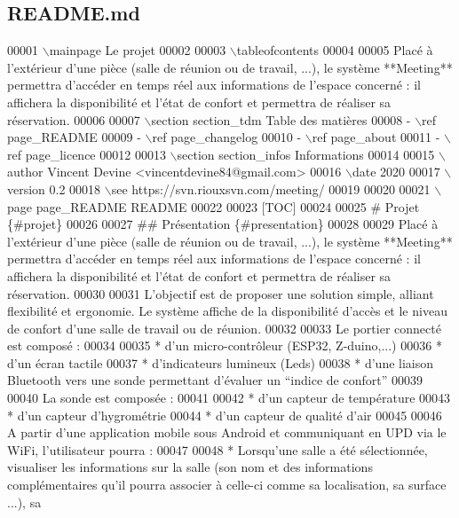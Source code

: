 \hypertarget{_r_e_a_d_m_e_8md_source}{}\subsection{R\+E\+A\+D\+M\+E.\+md}

\begin{DoxyCode}
00001 \(\backslash\)mainpage Le projet 
00002 
00003 \(\backslash\)tableofcontents
00004 
00005 Placé à l'extérieur d'une pièce (salle de réunion ou de travail, ...), le système **Meeting**
       permettra d'accéder en temps réel aux informations de l'espace concerné : il affichera la disponibilité et l'état de
       confort et permettra de réaliser sa réservation.
00006 
00007 \(\backslash\)section section\_tdm Table des matières
00008 - \(\backslash\)ref page\_README
00009 - \(\backslash\)ref page\_changelog
00010 - \(\backslash\)ref page\_about
00011 - \(\backslash\)ref page\_licence
00012 
00013 \(\backslash\)section section\_infos Informations
00014 
00015 \(\backslash\)author Vincent Devine <vincentdevine84@gmail.com>
00016 \(\backslash\)date 2020
00017 \(\backslash\)version 0.2
00018 \(\backslash\)see https://svn.riouxsvn.com/meeting/
00019 
00020 
00021 \(\backslash\)page page\_README README
00022 
00023 [TOC]
00024 
00025 # Projet \{#projet\}
00026 
00027 ## Présentation \{#presentation\}
00028 
00029 Placé à l'extérieur d'une pièce (salle de réunion ou de travail, ...), le système **Meeting**
       permettra d'accéder en temps réel aux informations de l'espace concerné : il affichera la disponibilité et l'état de
       confort et permettra de réaliser sa réservation.
00030 
00031 L'objectif est de proposer une solution simple, alliant flexibilité et ergonomie. Le système affiche
       de la disponibilité d'accès et le niveau de confort d'une salle de travail ou de réunion.
00032 
00033 Le portier connecté est composé :
00034 
00035 * d'un micro-contrôleur (ESP32, Z-duino,...)
00036 * d'un écran tactile
00037 * d'indicateurs lumineux (Leds)
00038 * d'une liaison Bluetooth vers une sonde permettant d'évaluer un “indice de confort”
00039 
00040 La sonde est composée :
00041 
00042 * d'un capteur de température
00043 * d'un capteur d'hygrométrie
00044 * d'un capteur de qualité d'air
00045 
00046 A partir d'une application mobile sous Android et communiquant en UPD via le WiFi, l'utilisateur
       pourra :
00047 
00048 * Lorsqu'une salle a été sélectionnée, visualiser les informations sur la salle (son nom et des
       informations complémentaires qu'il pourra associer à celle-ci comme sa localisation, sa surface ...), sa

\end{DoxyCode}
